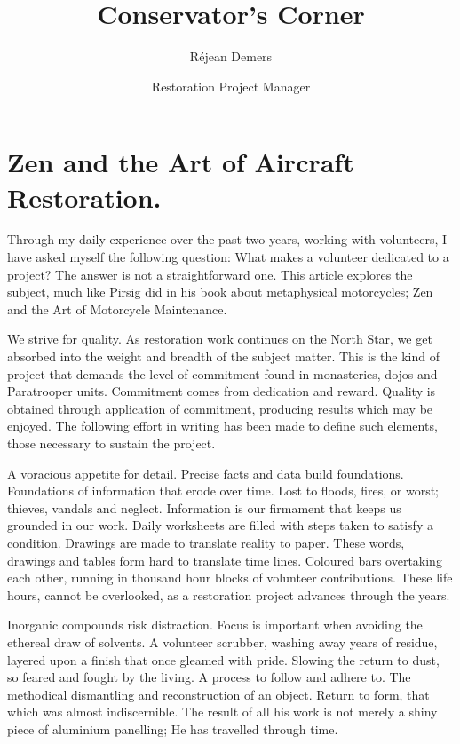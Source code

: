 %


\title{Conservator's Corner}
\author{R\'{e}jean Demers}
\author{Restoration Project Manager}

\maketitle

\section{Zen and the Art of Aircraft Restoration.}

Through my daily experience over the past two years, working with volunteers, I
have asked myself the following question: What makes a volunteer dedicated to a
project? The answer is not a straightforward one. This article explores the
subject, much like Pirsig did in his book about metaphysical motorcycles; Zen
and the Art of Motorcycle Maintenance.

We strive for quality. As restoration work continues on the North Star, we get
absorbed into the weight and breadth of the subject matter. This is the kind of
project that demands the level of commitment found in monasteries, dojos and
Paratrooper units. Commitment comes from dedication and reward. Quality is
obtained through application of commitment, producing results which may be
enjoyed. The following effort in writing has been made to define such elements,
those necessary to sustain the project.

A voracious appetite for detail. Precise facts and data build foundations.
Foundations of information that erode over time. Lost to floods, fires, or
worst; thieves, vandals and neglect. Information is our firmament that keeps us
grounded in our work. Daily worksheets are filled with steps taken to satisfy a
condition. Drawings are made to translate reality to paper. These words,
drawings and tables form hard to translate time lines. Coloured bars overtaking
each other, running in thousand hour blocks of volunteer contributions. These
life hours, cannot be overlooked, as a restoration project advances through the
years.

Inorganic compounds risk distraction. Focus is important when avoiding the
ethereal draw of solvents. A volunteer scrubber, washing away years of residue,
layered upon a finish that once gleamed with pride. Slowing the return to dust,
so feared and fought by the living. A process to follow and adhere to. The
methodical dismantling and reconstruction of an object. Return to form, that
which was almost indiscernible. The result of all his work is not merely a
shiny piece of aluminium panelling; He has travelled through time.

